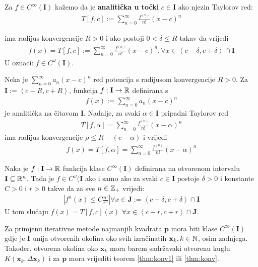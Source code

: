\documentclass[a4paper,twoside,12pt]{memoir} %
\begin{document}
\begin{defn}
	Za $f \in C^\infty(\mathbf{I})$ kažemo da je \textbf{analitička u točki} $c \in \mathbf{I}$ ako njezin Taylorov red:
	\begin{align*}
		T \left[f,c\right] := \sum_{n=0}^{\infty} \frac{f^{(n)}}{n!} \left(x - c\right)^n
	\end{align*}
	
	ima radijus konvergencije $R > 0$ i ako postoji $0 < \delta \leq R$ takav da vrijedi 
	\begin{align*}
	f(x) = T \left[f,c\right] := \sum_{n=0}^{\infty} \frac{f^{(n)}}{n!} \left(x - c\right)^n,
	\forall x \in \left < c-\delta, c+\delta \right > \cap \mathbf{I}
	\end{align*}
	U oznaci: $f \in C^\omega(\mathbf{I})$.
\end{defn}
\begin{thm}\label{thm:konv1}
	Neka je $\sum_{n=0}^{\infty} a_n \left(x - c\right)^n$ red potencija s radijusom konvergencije $R > 0$. Za $\mathbf{I} := \left < c-R, c+R\right >$,
	funkcija $f: \mathbf{I} \to \mathbb{R}$ definirana s 
	\begin{align}
		f(x) := \sum_{n=0}^{\infty} a_n \left(x - c\right)^n
	\end{align}
	je analitička na čitavom $\mathbf{I}$. Nadalje, za svaki $\alpha \in \mathbf{I}$ 
	pripadni Taylorov red
	\begin{align}
		T \left[f,\alpha \right] = \sum_{n=0}^{\infty} \frac{f^{(n)}}{n!} \left(x - \alpha \right)^n
	\end{align}
	ima radijus konvergencije $\rho \leq R - (c - \alpha)$ i vrijedi 
	\begin{align}
	f(x) = T \left[f,\alpha \right] = \sum_{n=0}^{\infty} \frac{f^{(n)}}{n!} \left(x - \alpha \right)^n
	\end{align}
\end{thm}


\begin{thm}\label{thm:konv}
	Naka je $f: \mathbf{I} \to \mathbb{R} $ funkcija klase $C^\infty(\mathbf{I})$ definirana
	na otvorenom intervalu $\mathbf{I} \subseteq \mathbb{R}^n$.
	Tada je $f \in C^\omega(\mathbf{I}$ ako i samo ako za svaki $c \in \mathbf{I}$ postoje
	$\delta > 0$ i konstante $C > 0$ i $ r > 0 $ takve da za sve $n \in \mathbb{Z}_+$ vrijedi:
	\begin{align}
		\left | f^{n}(x)  \leq  C \frac{n!}{r^n}  \right | 
		\forall x \in \mathbf{J} := \left < c-\delta, c+\delta \right > \cap \mathbf{I}
	\end{align}
U tom slučaju $f(x) = T \left[f,c\right](x) $ $
\forall x \in \left < c-r, c+r \right > \cap \mathbf{J}$.
\end{thm}
Za primjenu iterativne metode
najmanjih kvadrata $\mathbf{p}$ mora biti klase $C^\infty(\mathbf{I})$ gdje je $\mathbf{I}$ unija otvorenih okolina oko svih izračinatih $\mathbf{x}_k, k \in \mathbb{N}$, osim zadnjega.
Također, otvorena okolina oko $\mathbf{x}_k$  mora barem sadržavaki otvorenu kuglu $K(\mathbf{x}_k,\Delta \mathbf{x}_k)$ i za $\mathbf{p}$ mora vrijediti teorem \ref{thm:konv1} ili  \ref{thm:konv}.
\end{document}

